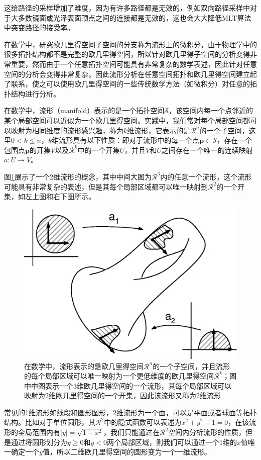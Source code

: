 这给路径的采样增加了难度，因为有许多路径都是无效的，例如双向路径采样中对于大多数镜面或光泽表面顶点之间的连接都是无效的，这也会大大降低MLT算法中突变路径的接受率。

在数学中，研究欧几里得空间子空间的分支称为流形上的微积分\cite{b:CalculusonManifolds:AModernApproachtoClassicalTheoremsofAdvancedCalculus,b:AnalysisOnManifolds}，由于物理学中的很多拓扑结构都不是完整的欧几里得空间，所以针对欧几里得子空间的分析变得非常重要，然而由于一个任意拓扑空间可能具有非常复杂的数学表述，因此针对任意空间的分析会变得非常复杂，因此流形分析在任意空间拓扑和欧几里得空间建立起了联系，使之可以使用欧几里得空间的一些传统数学方法（如微积分）对任意的拓扑结构进行分析。

在数学中，流形（manifold）表示的是一个拓扑空间$\mathcal{S}$，该空间内每一个点邻近的某个局部空间可以近似为一个欧几里得空间。实践中，我们常对每个局部空间都可以映射为相同维度的流形感兴趣，称为$k$维流形，它表示的是$\mathcal{R}^{n}$的一个子空间，这里$0<k\leq n$，$k$维流形具有以下性质：即对于流形中的每一个点$\mathbf{p}\in\mathcal{S}$，存在一个包围点$\mathbf{p}$的开集$V$以及$\mathcal{R}^{k}$中的一个开集$U$，并且$V$和$U$之间存在一个唯一的连续映射$a:U\to V$。

图\ref{f:mlt-manifolds}展示了一个2维流形的概念，其中中间大图为$\mathcal{R}^{3}$内的任意一个流形，这个流形可能具有非常复杂的表述，但是其每个局部区域都可以唯一映射到$\mathcal{R}^{2}$的一个开集，如左上图和右下图所示。

\begin{figure}
\sidecaption
	\includegraphics[width=.55\textwidth]{figures/mlt/manifolds}
	\caption{在数学中，流形表示的是欧几里得空间$\mathcal{R}^{n}$的一个子空间，并且流形的每个局部区域可以唯一映射为一个更低维度的欧几里得空间$\mathcal{R}^{k}$；图中中图表示一个3维欧几里得空间的一个流形，其每个局部区域可以映射为2维欧几里得空间的一个开集，因此该流形又称为2维流形}
	\label{f:mlt-manifolds}
\end{figure}

常见的1维流形如线段和圆形图形，2维流形为一个面，可以是平面或者球面等拓扑结构。比如对于单位圆形，其$\mathcal{R}^{2}$中的隐式函数可以表述为$x^{2}+y^{2}-1=0$，在该流形的全局范围内有$|y|=\sqrt{1-x^{2}}$，我们只能通过在$\mathcal{R}^{2}$空间内分析流形的性质，但是通过将圆形划分为$y\geq 0$和$y<0$两个局部区域，则我们可以通过一个1维的$x$值唯一确定一个$y$值，所以二维欧几里得空间的圆形变为一个一维流形。

